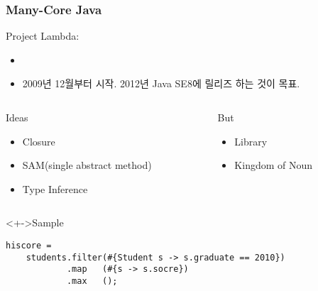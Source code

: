 \begin{frame}[fragile]
\frametitle{Many-Core Java}

Project Lambda: 
\begin{itemize}
\item {}
\item 2009년 12월부터 시작. 2012년 Java SE8에 릴리즈 하는 것이 목표.
\end{itemize}

\begin{columns}
    \begin{column}{0.5\textwidth}
        Ideas
        \begin{itemize}
        \item Closure
        \item SAM(single abstract method)
        \item Type Inference
        \end{itemize}
    \end{column}

    \begin{column}{0.5\textwidth}
        But
        \begin{itemize}
        \item Library
        \item Kingdom of Noun
        \end{itemize}
    \end{column}
\end{columns}

\lstset{language=Java,basicstyle=\small}
\begin{block}<+->{Sample}
\begin{lstlisting}
hiscore = 
    students.filter(#{Student s -> s.graduate == 2010})
            .map   (#{s -> s.socre}) 
            .max   ();
\end{lstlisting}
\end{block}

\end{frame}

